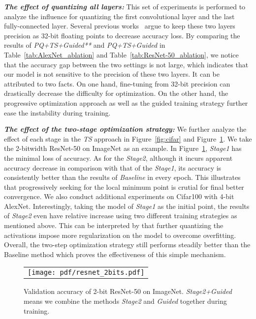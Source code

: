 \vspace{1mm}
\noindent\textbf{{\emph{The effect of quantizing all layers:}}}
This set of experiments is performed to analyze the influence for quantizing the first convolutional layer and the last fully-connected layer. Several previous works~\cite{zhu2016trained} argue to keep these two layers precision as 32-bit floating points to decrease accuracy loss. By comparing the results of \emph{PQ+TS+Guided**} and \emph{PQ+TS+Guided} in Table~\ref{tab:AlexNet_ablation} and Table~\ref{tab:ResNet-50_ablation}, we notice that the accuracy gap between the two settings is not large, which indicates that our model is not sensitive to the precision of these two layers. It can be attributed to two facts. On one hand, fine-tuning from 32-bit precision can drastically decrease the difficulty for optimization. On the other hand, the progressive optimization approach as well as the guided training strategy further ease the instability during training.

\vspace{1mm}
\noindent\textbf{{\emph{The effect of the two-stage optimization strategy:}}}
We further analyze the effect of each stage in the \emph{TS} approach in Figure~\ref{fig:cifar} and Figure~\ref{fig:resnet_2bits}.
We take the 2-bitwidth ResNet-50 on ImageNet as an example. In Figure~\ref{fig:resnet_2bits}, \emph{Stage1} has the minimal loss of accuracy. As for the \emph{Stage2}, although it incurs apparent accuracy decrease in comparison with that of the \emph{Stage1}, its accuracy is consistently better than the results of \emph{Baseline} in every epoch. This illustrates that progressively seeking for the local minimum point is crutial for final better convergence. We also conduct additional experiments on Cifar100 with 4-bit AlexNet. Interestingly, taking the model of \emph{Stage1} as the initial point, the results of \emph{Stage2} even have relative increase using two different training strategies as mentioned above. This can be interpreted by that further quantizing the activations impose more regularization on the model to overcome overfitting.
Overall, the two-step optimization strategy still performs steadily better than the Baseline method which proves the effectiveness of this simple mechanism.
\begin{figure}[!htb]
	\centering
	\resizebox{0.9\linewidth}{!}
	{
		\begin{tabular}{c}
			\texttt{[image: pdf/resnet\_2bits.pdf]}
		\end{tabular}
	}
	\caption{Validation accuracy of 2-bit ResNet-50 on ImageNet. \emph{Stage2+Guided} means we combine the methods \emph{Stage2} and \emph{Guided} together during training.}
	\label{fig:resnet_2bits}
\end{figure}

